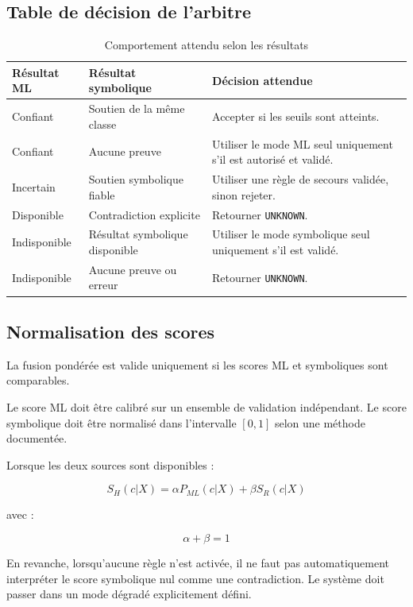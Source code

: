 \subsection{Table de décision de l'arbitre}

\begin{table}[H]
\centering
\caption{Comportement attendu selon les résultats}
\label{tab:decision_arbitre}
\begin{tabularx}{\textwidth}{|l|l|X|}
\hline
\textbf{Résultat ML} & \textbf{Résultat symbolique} &
\textbf{Décision attendue} \\
\hline
Confiant & Soutien de la même classe &
Accepter si les seuils sont atteints. \\
\hline
Confiant & Aucune preuve &
Utiliser le mode ML seul uniquement s'il est autorisé et validé. \\
\hline
Incertain & Soutien symbolique fiable &
Utiliser une règle de secours validée, sinon rejeter. \\
\hline
Disponible & Contradiction explicite &
Retourner \texttt{UNKNOWN}. \\
\hline
Indisponible & Résultat symbolique disponible &
Utiliser le mode symbolique seul uniquement s'il est validé. \\
\hline
Indisponible & Aucune preuve ou erreur &
Retourner \texttt{UNKNOWN}. \\
\hline
\end{tabularx}
\end{table}

\subsection{Normalisation des scores}

La fusion pondérée est valide uniquement si les scores
ML et symboliques sont comparables.

Le score ML doit être calibré sur un ensemble de validation
indépendant. Le score symbolique doit être normalisé
dans l'intervalle $[0,1]$ selon une méthode documentée.

Lorsque les deux sources sont disponibles :

\[
S_H(c|X)=
\alpha P_{ML}(c|X)+\beta S_R(c|X)
\]

avec :

\[
\alpha+\beta=1
\]

En revanche, lorsqu'aucune règle n'est activée, il ne faut
pas automatiquement interpréter le score symbolique nul
comme une contradiction. Le système doit passer dans
un mode dégradé explicitement défini.

